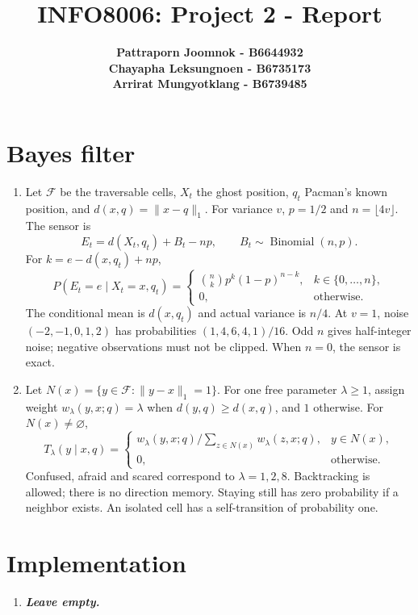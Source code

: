 \documentclass{article}
\begin{document}
\title{\Large{INFO8006: Project 2 - Report}}
\vspace{1cm}
\author{\small{\bf Pattraporn Joomnok - B6644932} \\
\small{\bf Chayapha Leksungnoen - B6735173} \\
\small{\bf Arrirat Mungyotklang - B6739485}}
\maketitle
\section{Bayes filter}
\begin{enumerate}[label=\alph*.,leftmargin=*]
\item Let $\mathcal F$ be the traversable cells, $X_t$ the ghost position,
$q_t$ Pacman's known position, and $d(x,q)=\|x-q\|_1$. For variance $v$,
$p=1/2$ and $n=\lfloor4v\rfloor$. The sensor is
\[E_t=d(X_t,q_t)+B_t-np,\qquad B_t\sim\operatorname{Binomial}(n,p).\]
For $k=e-d(x,q_t)+np$,
\[P(E_t=e\mid X_t=x,q_t)=
\begin{cases}\binom nk p^k(1-p)^{n-k},&k\in\{0,\ldots,n\},\\
0,&\text{otherwise}.\end{cases}\]
The conditional mean is $d(x,q_t)$ and actual variance is $n/4$.
At $v=1$, noise $(-2,-1,0,1,2)$ has probabilities $(1,4,6,4,1)/16$.
Odd $n$ gives half-integer noise; negative observations must not be
clipped. When $n=0$, the sensor is exact.
\item Let $N(x)=\{y\in\mathcal F:\|y-x\|_1=1\}$. For one free parameter
$\lambda\geq1$, assign weight $w_\lambda(y,x;q)=\lambda$ when
$d(y,q)\geq d(x,q)$, and $1$ otherwise. For $N(x)\ne\varnothing$,
\[T_\lambda(y\mid x,q)=
\begin{cases}w_\lambda(y,x;q)/\sum_{z\in N(x)}w_\lambda(z,x;q),&y\in N(x),\\
0,&\text{otherwise}.\end{cases}\]
Confused, afraid and scared correspond to $\lambda=1,2,8$.
Backtracking is allowed; there is no direction memory. Staying still
has zero probability if a neighbor exists. An isolated cell has a
self-transition of probability one.
\end{enumerate}
\section{Implementation}
\begin{enumerate}[label=\alph*.,leftmargin=*]
\item \textbf{\textit{Leave empty.}}
\end{enumerate}
\newpage
\end{document}

